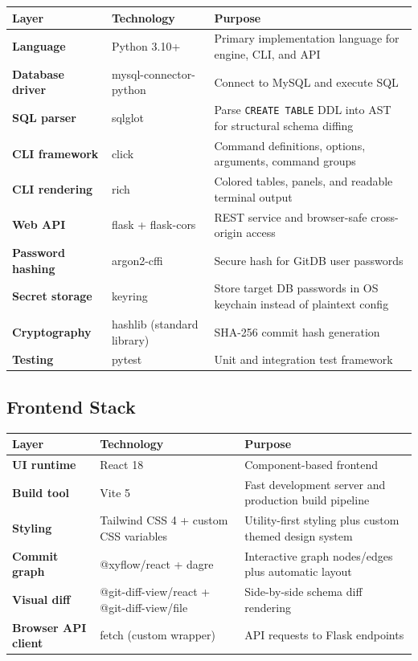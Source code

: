 \documentclass[12pt, a4paper]{article}
\begin{document}
\renewcommand{\arraystretch}{1.3}
\begin{longtable}{@{}>{\bfseries}p{2.7cm} >{\ttfamily}p{3.3cm} p{9.3cm}@{}}
\toprule
Layer & Technology & Purpose \\
\midrule
Language & Python 3.10+ & Primary implementation language for engine, CLI, and API \\
Database driver & mysql-connector-python & Connect to MySQL and execute SQL \\
SQL parser & sqlglot & Parse \texttt{CREATE TABLE} DDL into AST for structural schema diffing \\
CLI framework & click & Command definitions, options, arguments, command groups \\
CLI rendering & rich & Colored tables, panels, and readable terminal output \\
Web API & flask + flask-cors & REST service and browser-safe cross-origin access \\
Password hashing & argon2-cffi & Secure hash for GitDB user passwords \\
Secret storage & keyring & Store target DB passwords in OS keychain instead of plaintext config \\
Cryptography & hashlib (standard library) & SHA-256 commit hash generation \\
Testing & pytest & Unit and integration test framework \\
\bottomrule
\end{longtable}

\subsection{Frontend Stack}

\renewcommand{\arraystretch}{1.3}
\begin{longtable}{@{}>{\bfseries}p{2.7cm} >{\ttfamily}p{3.3cm} p{9.3cm}@{}}
\toprule
Layer & Technology & Purpose \\
\midrule
UI runtime & React 18 & Component-based frontend \\
Build tool & Vite 5 & Fast development server and production build pipeline \\
Styling & Tailwind CSS 4 + custom CSS variables & Utility-first styling plus custom themed design system \\
Commit graph & @xyflow/react + dagre & Interactive graph nodes/edges plus automatic layout \\
Visual diff & @git-diff-view/react + @git-diff-view/file & Side-by-side schema diff rendering \\
Browser API client & fetch (custom wrapper) & API requests to Flask endpoints \\
\bottomrule
\end{longtable}
\end{document}
